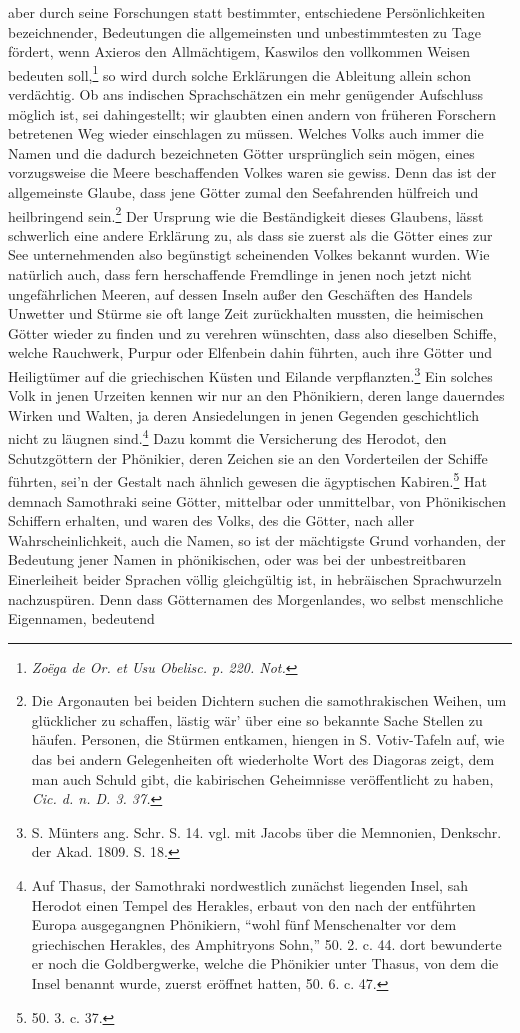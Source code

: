 \documentclass[a4paper, 11pt, oneside]{article}
\begin{document}
aber durch seine Forschungen statt bestimmter, entschiedene Persönlichkeiten bezeichnender, Bedeutungen die allgemeinsten und unbestimmtesten zu Tage fördert, wenn Axieros den Allmächtigem, Kaswilos den vollkommen Weisen bedeuten soll,\footnote{\emph{Zoëga de Or. et Usu Obelisc. p. 220. Not.}} so wird durch solche Erklärungen die Ableitung allein schon verdächtig. Ob ans indischen Sprachschätzen ein mehr genügender Aufschluss möglich ist, sei dahingestellt; wir glaubten einen andern von früheren Forschern betretenen Weg wieder einschlagen zu müssen. Welches Volks auch immer die Namen und die dadurch bezeichneten Götter ursprünglich sein mögen, eines vorzugsweise die Meere beschaffenden Volkes waren sie gewiss. Denn das ist der allgemeinste Glaube, dass jene Götter zumal den Seefahrenden hülfreich und heilbringend sein.\footnote{Die Argonauten bei beiden Dichtern suchen die samothrakischen Weihen, um glücklicher zu schaffen, lästig wär' über eine so bekannte Sache Stellen zu häufen. Personen, die Stürmen entkamen, hiengen in S. Votiv-Tafeln auf, wie das bei andern Gelegenheiten oft wiederholte Wort des Diagoras zeigt, dem man auch Schuld gibt, die kabirischen Geheimnisse veröffentlicht zu haben, \emph{Cic. d. n. D. 3. 37.}} Der Ursprung wie die Beständigkeit dieses Glaubens, lässt schwerlich eine andere Erklärung zu, als dass sie zuerst als die Götter eines zur See unternehmenden also begünstigt scheinenden Volkes bekannt wurden. Wie natürlich auch, dass fern herschaffende Fremdlinge in jenen noch jetzt nicht ungefährlichen Meeren, auf dessen Inseln außer den Geschäften des Handels Unwetter und Stürme sie oft lange Zeit zurückhalten mussten, die heimischen Götter wieder zu finden und zu verehren wünschten, dass also dieselben Schiffe, welche Rauchwerk, Purpur oder Elfenbein dahin führten, auch ihre Götter und Heiligtümer auf die griechischen Küsten und Eilande verpflanzten.\footnote{S. Münters ang. Schr. S. 14. vgl. mit Jacobs über die Memnonien, Denkschr. der Akad. 1809. S. 18.} Ein solches Volk in jenen Urzeiten kennen wir nur an den Phönikiern, deren lange dauerndes Wirken und Walten, ja deren Ansiedelungen in jenen Gegenden geschichtlich nicht zu läugnen sind.\footnote{Auf Thasus, der Samothraki nordwestlich zunächst liegenden Insel, sah Herodot einen Tempel des Herakles, erbaut von den nach der entführten Europa ausgegangnen Phönikiern, "`wohl fünf Menschenalter vor dem griechischen Herakles, des Amphitryons Sohn,"' 50. 2. c. 44. dort bewunderte er noch die Goldbergwerke, welche die Phönikier unter Thasus, von dem die Insel benannt wurde, zuerst eröffnet hatten, 50. 6. c. 47.} Dazu kommt die Versicherung des Herodot, den Schutzgöttern der Phönikier, deren Zeichen sie an den Vorderteilen der Schiffe führten, sei'n der Gestalt nach ähnlich gewesen die ägyptischen Kabiren.\footnote{50. 3. c. 37.} Hat demnach Samothraki seine Götter, mittelbar oder unmittelbar, von Phönikischen Schiffern erhalten, und waren des Volks, des die Götter, nach aller Wahrscheinlichkeit, auch die Namen, so ist der mächtigste Grund vorhanden, der Bedeutung jener Namen in phönikischen, oder was bei der unbestreitbaren Einerleiheit beider Sprachen völlig gleichgültig ist, in hebräischen Sprachwurzeln nachzuspüren. Denn dass Götternamen des Morgenlandes, wo selbst menschliche Eigennamen, bedeutend 
\end{document}

